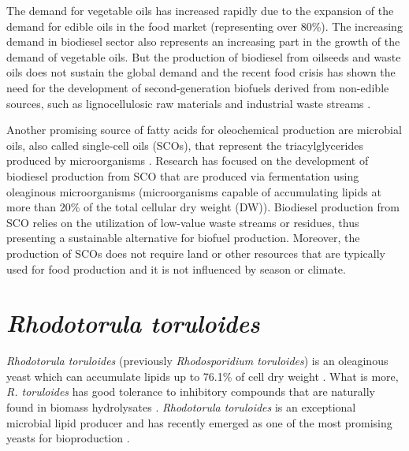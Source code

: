 
The demand for vegetable oils has increased rapidly due to the expansion
of the demand for edible oils in the food market (representing over 80\%).
The increasing demand in biodiesel sector also represents an increasing part in the growth of the demand of vegetable oils. \cite{rosillo2009global}
But the production of biodiesel from oilseeds and waste oils does not sustain the 
global demand \cite{Koutinas2014} and the recent food crisis has shown the 
need for the development of second-generation biofuels derived from non-edible sources, 
such as lignocellulosic raw materials and industrial waste streams \cite{Koutinas2011}.

Another promising source of fatty acids for oleochemical production are microbial oils, also called single-cell oils (SCOs), that represent
the triacylglycerides produced by microorganisms \cite{Bonturi2017}.
Research has focused on the development 
of biodiesel production from SCO that are produced via fermentation using oleaginous microorganisms (microorganisms 
capable of accumulating lipids at more than 20\% of the total cellular dry weight (DW)). 
Biodiesel production from SCO relies on the utilization of low-value waste streams 
or residues, thus presenting a sustainable alternative for biofuel production. 
Moreover, the production of SCOs does not require land or other resources that are typically used for food production 
and it is not influenced by season or climate. \cite{Koutinas2014} 


\section{\textit{Rhodotorula toruloides}} %

\textit{Rhodotorula toruloides} (previously \textit{Rhodosporidium toruloides}) is an oleaginous yeast
which can accumulate lipids up to 76.1\% of cell dry weight \cite{Li2007}. 
What is more, \textit{R. toruloides} has good tolerance to inhibitory compounds that are naturally found in biomass hydrolysates \cite{Hu2009}.
\textit{Rhodotorula toruloides} is an exceptional microbial lipid producer and has recently emerged as one of the most promising yeasts for bioproduction \cite{Wu2023, Park2018}.

